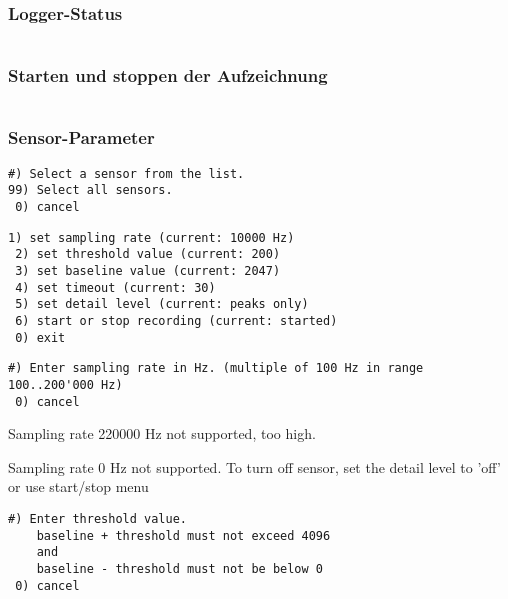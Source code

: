 \subsubsection{Logger-Status}
\begin{lstlisting}[caption=Untermenü Logger-Status, label=list.loggerstatus]

\end{lstlisting}


\subsubsection{Starten und stoppen der Aufzeichnung}
\begin{lstlisting}[caption=Untermenü Starten und Stoppen der Aufzeichnung, label=list.startstop]
\end{lstlisting}


\subsubsection{Sensor-Parameter}
\begin{lstlisting}[caption=Untermenü Sensor-Auswahl, label=list.sensorsel]
 #) Select a sensor from the list.
99) Select all sensors.
 0) cancel
\end{lstlisting}

\begin{lstlisting}[caption=Untermenü Sensor-Parameter, label=list.sensorparam]
 1) set sampling rate (current: 10000 Hz)
 2) set threshold value (current: 200)
 3) set baseline value (current: 2047)
 4) set timeout (current: 30)
 5) set detail level (current: peaks only)
 6) start or stop recording (current: started)
 0) exit
\end{lstlisting}

\begin{lstlisting}[caption=Untermenü Abtastrate, label=list.paramfs]
 #) Enter sampling rate in Hz. (multiple of 100 Hz in range 100..200'000 Hz)
 0) cancel
\end{lstlisting}

Sampling rate 220000 Hz not supported, too high.

Sampling rate 0 Hz not supported.
To turn off sensor, set the detail level to 'off'
or use start/stop menu




\begin{lstlisting}[caption=Untermenü Threshold, label=list.paramthres]
 #) Enter threshold value.
    baseline + threshold must not exceed 4096
    and
    baseline - threshold must not be below 0
 0) cancel
\end{lstlisting}

